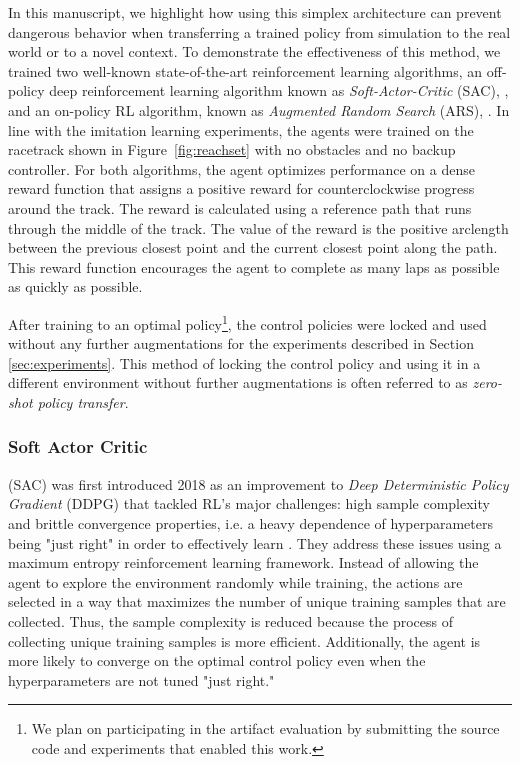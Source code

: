 \documentclass[manuscript,screen,review]{acmart}
\newcommand{\figref}[1]{Figure~\ref{#1}}
\begin{document}
In this manuscript, we highlight how using this simplex architecture can prevent dangerous behavior when transferring a trained policy from simulation to the real world or to a novel context.
To demonstrate the effectiveness of this method, we trained two well-known state-of-the-art reinforcement learning algorithms, an off-policy deep reinforcement learning algorithm known as \emph{Soft-Actor-Critic} (SAC), \cite{haarnoja2018soft}, and an on-policy RL algorithm, known as \emph{Augmented Random Search} (ARS), \cite{mania2018simple}. %
In line with the imitation learning experiments, the agents were trained on the racetrack shown in \figref{fig:reachset} with no obstacles and no backup controller. For both algorithms, the agent optimizes performance on a dense reward function that assigns a positive reward for counterclockwise progress around the track. The reward is calculated using a reference path that runs through the middle of the track. The value of the reward is the positive arclength between the previous closest point and the current closest point along the path. This reward function encourages the agent to complete as many laps as possible as quickly as possible.

After training to an optimal policy\footnote{We plan on participating in the artifact evaluation by submitting the source code and experiments that enabled this work.}, the control policies were locked and used without any further augmentations for the experiments described in Section \ref{sec:experiments}. This method of locking the control policy and using it in a different environment without further augmentations is often referred to as \emph{zero-shot policy transfer}.


\subsubsection{Soft Actor Critic}
(SAC) was first introduced 2018 as an improvement to \emph{Deep Deterministic Policy Gradient} (DDPG) that tackled RL's major challenges: high sample complexity and brittle convergence properties, i.e. a heavy dependence of hyperparameters being "just right" in order to effectively learn \cite{haarnoja2018soft}. They address these issues using a maximum entropy reinforcement learning framework. Instead of allowing the agent to explore the environment randomly while training, the actions are selected in a way that maximizes the number of unique training samples that are collected. Thus, the sample complexity is reduced because the process of collecting unique training samples is more efficient. Additionally, the agent is more likely to converge on the optimal control policy even when the hyperparameters are not tuned "just right."
\end{document}
